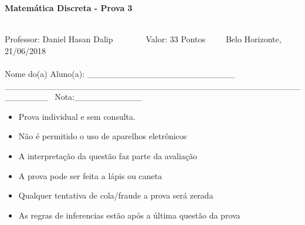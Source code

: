 \documentclass[16pt]{examdesign}
\begin{document}
\begin{examtop}

      
    \begin{multicols}{2}[]
    \begin{minipage}{2.5cm}
    \end{minipage}
      \columnbreak
      \begin{minipage}{400px}
      \begin{center}\large{\textbf{Matemática Discreta - Prova 3}}\end{center}~\\
      Professor: Daniel Hasan Dalip~~~~~~~~Valor: 33 Pontos~~~~~Belo Horizonte, 21/06/2018\\~\\
      Nome do(a) Aluno(a): \_\_\_\_\_\_\_\_\_\_\_\_\_\_\_\_\_\_\_\_\_\_\_\_	\_\_\_\_\_\_\_\_\_\_\_\_\_\_\_\_\_\_\_\_\_\_\_\_\_\_\_\_\_\_\_\_\_\_\_\_\_\_\_\_\_\_\_\_\_\_\_\_\_\_\_\_\_\_\_~
      Nota:\_\_\_\_\_\_\_\_\_\_\_\\       
      \end{minipage}



    \end{multicols}
  \hrulefill
  \begin{multicols}{2}[]
  
    \begin{itemize}
    \item Prova individual e sem consulta.\vspace{-6pt}
    \item Não é permitido o uso de aparelhos eletrônicos  \vspace{-6pt}
    \item A interpretação da questão faz parte da avaliação  \vspace{-6pt}
    \item A prova pode ser feita a lápis ou caneta  \vspace{-6pt}
    \item Qualquer tentativa de cola/fraude a prova será zerada  \vspace{-6pt}
    \item As regras de inferencias estão após a última questão da prova  \vspace{-6pt}
    \end{itemize}
  \end{multicols}

\def\arraystretch{1}
\end{examtop}
\end{document}
